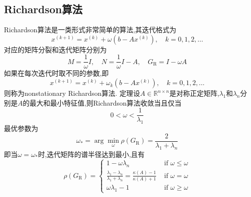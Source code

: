 \documentclass[12pt,a4paper]{article}
\begin{document}
\subsection{\color{blue}Richardson算法}
Richardson算法是一类形式非常简单的算法,其迭代格式为
$$
x^{(k+1)}=x^{(k)}+\omega\left(b-A x^{(k)}\right), \quad k=0,1,2, \ldots
$$
对应的矩阵分裂和迭代矩阵分别为
$$
M=\frac{1}{\omega} I, \quad N=\frac{1}{\omega} I-A, \quad G_{\mathrm{R}}=I-\omega A
$$
如果在每次迭代时取不同的参数,即
$$
x^{(k+1)}=x^{(k)}+\omega_{k}\left(b-A x^{(k)}\right), \quad k=0,1,2, \ldots
$$
则称为nonstationary Richardson算法.
{\color{blue}定理}设$A \in \mathbb{R}^{n \times n}$是对称正定矩阵,$\lambda_1$和$\lambda_n$分别是$A$的最大和最小特征值,则Richardson算法收敛当且仅当
$$
0<\omega<\frac{1}{\lambda_{1}}
$$
最优参数为
$$
\omega_{*}=\arg \min _{\omega} \rho\left(G_{\mathrm{R}}\right)=\frac{2}{\lambda_{1}+\lambda_{n}}
$$
即当$\omega=\omega_{*}$时,迭代矩阵的谱半径达到最小,且有
$$
\rho\left(G_{\mathrm{R}}\right)=\left\{\begin{array}{ll}{1-\omega \lambda_{n}} & {\text { if } \omega \leq \omega} \\ {\frac{\lambda_{1}-\lambda_{n}}{\lambda_{1}+\lambda_{n}}=\frac{\kappa(A)-1}{\kappa(A)+1}} & {\text { if } \omega=\omega} \\ {\omega \lambda_{1}-1} & {\text { if } \omega \geq \omega}\end{array}\right.
$$
\end{document}
